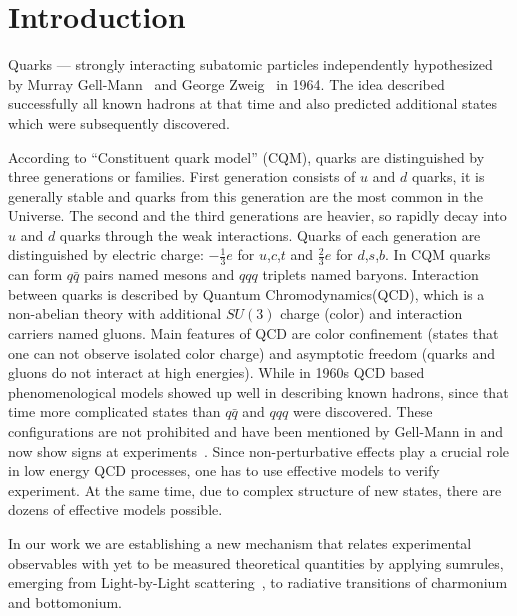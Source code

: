 \chapter{Introduction}
Quarks --- strongly interacting subatomic particles independently hypothesized by Murray Gell-Mann~\cite{gellmann-quarks} and George Zweig~\cite{zweig-quarks} in 1964. The idea described successfully all known hadrons at that time and also predicted additional states which were subsequently discovered.

According to ``Constituent quark model'' (CQM), quarks are distinguished by three generations or families. First generation consists of $u$ and $d$ quarks, it is generally stable and quarks from this generation are the most common in the Universe. The second and the third generations are heavier, so rapidly decay into $u$ and $d$ quarks through the weak interactions. Quarks of each generation are distinguished by electric charge: $-\frac{1}{3}e$ for $u$,$c$,$t$ and $\frac{2}{3}e$ for $d$,$s$,$b$. In CQM quarks can form $q \bar{q}$ pairs named mesons and $qqq$ triplets named baryons. Interaction between quarks is described by Quantum Chromodynamics(QCD), which is a non-abelian theory with additional $SU(3)$ charge (color) and  interaction carriers named gluons. Main features of QCD are color confinement (states that one can not observe isolated color charge) and asymptotic freedom (quarks and gluons do not interact at high energies).
While in 1960s QCD based phenomenological models showed up well in describing known hadrons, since that time more complicated states than $q\bar{q}$ and $qqq$ were discovered. These configurations are not prohibited and have been mentioned by Gell-Mann in \cite{gellmann-quarks} and now show signs at experiments~\cite{Xbabar,Xbelle,Ybabar}. Since non-perturbative effects play a crucial role in low energy QCD processes, one has to use effective models to verify experiment. At the same time, due to complex structure of new states, there are dozens of effective models possible.

In our work we are establishing a new mechanism that relates experimental observables with yet to be measured theoretical quantities by applying sumrules, emerging from Light-by-Light scattering~\cite{lbl-sum1,lbl-sum2}, to radiative transitions of charmonium and bottomonium.

